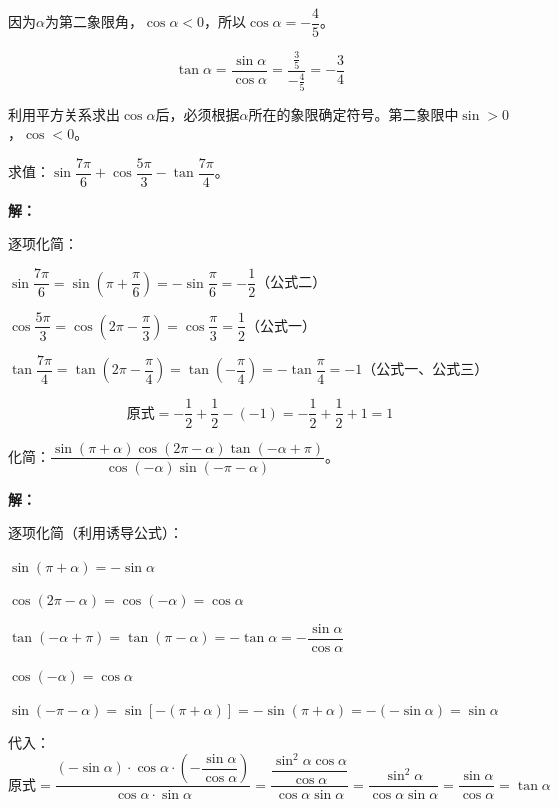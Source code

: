 \documentclass[12pt, a4paper]{ctexart}
\begin{document}
因为$\alpha$为第二象限角，$\cos\alpha<0$，所以$\cos\alpha=-\dfrac{4}{5}$。

\[
  \tan\alpha=\frac{\sin\alpha}{\cos\alpha}=\frac{\frac{3}{5}}{-\frac{4}{5}}=-\frac{3}{4}
\]

\begin{tipbox}[方法总结]
利用平方关系求出$\cos\alpha$后，必须根据$\alpha$所在的象限确定符号。第二象限中$\sin>0$，$\cos<0$。
\end{tipbox}

\begin{examplebox}[【例题5】利用诱导公式化简求值]
求值：$\sin\dfrac{7\pi}{6}+\cos\dfrac{5\pi}{3}-\tan\dfrac{7\pi}{4}$。
\end{examplebox}

\textbf{解：}

逐项化简：

$\sin\dfrac{7\pi}{6}=\sin\!\left(\pi+\dfrac{\pi}{6}\right)=-\sin\dfrac{\pi}{6}=-\dfrac{1}{2}$（公式二）

$\cos\dfrac{5\pi}{3}=\cos\!\left(2\pi-\dfrac{\pi}{3}\right)=\cos\dfrac{\pi}{3}=\dfrac{1}{2}$（公式一）

$\tan\dfrac{7\pi}{4}=\tan\!\left(2\pi-\dfrac{\pi}{4}\right)=\tan\!\left(-\dfrac{\pi}{4}\right)=-\tan\dfrac{\pi}{4}=-1$（公式一、公式三）

\[
  \text{原式}=-\frac{1}{2}+\frac{1}{2}-(-1)=-\frac{1}{2}+\frac{1}{2}+1=1
\]

\begin{examplebox}[【例题6】诱导公式综合化简]
化简：$\dfrac{\sin(\pi+\alpha)\cos(2\pi-\alpha)\tan(-\alpha+\pi)}{\cos(-\alpha)\sin(-\pi-\alpha)}$。
\end{examplebox}

\textbf{解：}

逐项化简（利用诱导公式）：

$\sin(\pi+\alpha)=-\sin\alpha$

$\cos(2\pi-\alpha)=\cos(-\alpha)=\cos\alpha$

$\tan(-\alpha+\pi)=\tan(\pi-\alpha)=-\tan\alpha=-\dfrac{\sin\alpha}{\cos\alpha}$

$\cos(-\alpha)=\cos\alpha$

$\sin(-\pi-\alpha)=\sin[-(\pi+\alpha)]=-\sin(\pi+\alpha)=-(-\sin\alpha)=\sin\alpha$

代入：
\[
  \text{原式}=\frac{(-\sin\alpha)\cdot\cos\alpha\cdot\left(-\dfrac{\sin\alpha}{\cos\alpha}\right)}{\cos\alpha\cdot\sin\alpha}
  =\frac{\dfrac{\sin^2\alpha\cos\alpha}{\cos\alpha}}{\cos\alpha\sin\alpha}
  =\frac{\sin^2\alpha}{\cos\alpha\sin\alpha}
  =\frac{\sin\alpha}{\cos\alpha}
  =\tan\alpha
\]
\end{document}
